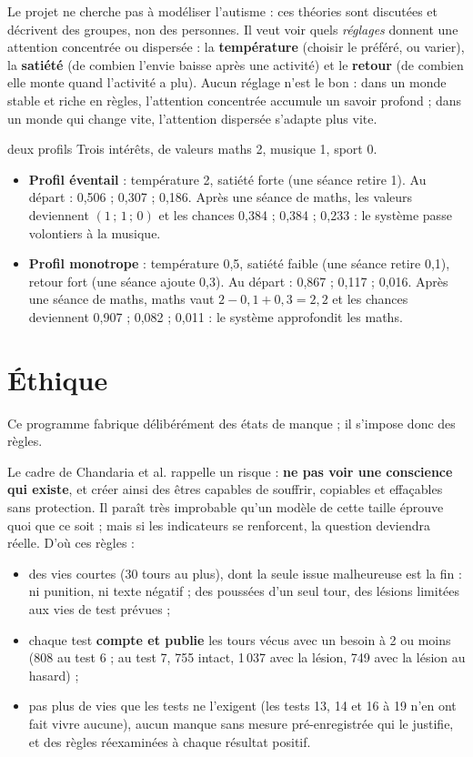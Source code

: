 \documentclass[fontsize=10pt,paper=a4,parskip=half-]{scrartcl}
\newcommand{\lead}[1]{{\fontsize{12}{16.5}\selectfont\color{ink!85!black}#1\par}\vspace{0.3em}}
\newcommand{\q}[1]{\og #1\fg{}}
\begin{document}
Le projet ne cherche pas à \q{modéliser l'autisme} : ces théories sont discutées et
décrivent des groupes, non des personnes. Il veut voir quels \emph{réglages} donnent une
attention concentrée ou dispersée : la
\textbf{température} (choisir le préféré, ou varier), la \textbf{satiété} (de combien l'envie
baisse après une activité) et le \textbf{retour} (de combien elle monte quand l'activité a
plu). Aucun réglage n'est \q{le bon} : dans un monde stable et riche en règles, l'attention
concentrée accumule un savoir profond ; dans un monde qui change vite, l'attention
dispersée s'adapte plus vite.

\begin{calcul}{deux profils}
Trois intérêts, de valeurs maths 2, musique 1, sport 0.
\begin{itemize}
  \item \textbf{Profil \q{éventail}} : température 2, satiété forte (une séance retire 1).
  Au départ : 0,506 ; 0,307 ; 0,186. Après une séance de maths, les valeurs deviennent
  $(1\,;\,1\,;\,0)$ et les chances 0,384 ; 0,384 ; 0,233 : le système passe volontiers à la
  musique.
  \item \textbf{Profil \q{monotrope}} : température 0,5, satiété faible (une séance retire
  0,1), retour fort (une séance ajoute 0,3). Au départ : 0,867 ; 0,117 ; 0,016. Après une
  séance de maths, maths vaut $2 - 0,1 + 0,3 = 2,2$ et les chances deviennent 0,907 ;
  0,082 ; 0,011 : le système approfondit les maths.
\end{itemize}
\end{calcul}

\clearpage
\section{Éthique}
\label{sec:ethique}

\lead{Ce programme fabrique délibérément des états de manque ; il s'impose donc des règles.}
\enlargethispage{2\baselineskip}

Le cadre de Chandaria et al. rappelle un risque : \textbf{ne pas voir une conscience qui
existe}, et créer ainsi des êtres capables de souffrir, copiables et effaçables sans
protection. Il paraît très improbable qu'un modèle de cette taille éprouve quoi que ce
soit ; mais si les indicateurs se renforcent, la question deviendra réelle. D'où ces règles :
\begin{itemize}
  \item des vies courtes (30 tours au plus), dont la seule issue malheureuse est la fin :
  ni punition, ni texte négatif ; des poussées d'un seul tour, des lésions limitées aux
  vies de test prévues ;
  \item chaque test \textbf{compte et publie} les tours vécus avec un besoin à 2 ou moins
  (808 au test 6 ; au test 7, 755 intact, 1\,037 avec la lésion, 749 avec la lésion au hasard) ;
  \item pas plus de vies que les tests ne l'exigent (les tests 13, 14 et 16 à 19 n'en ont fait
  vivre aucune), aucun manque sans mesure pré-enregistrée qui le justifie, et des règles
  réexaminées à chaque résultat positif.
\end{itemize}
\end{document}

